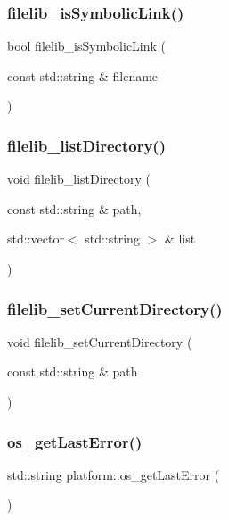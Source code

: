 \subsubsection{\texorpdfstring{filelib\+\_\+is\+Symbolic\+Link()}{filelib\_isSymbolicLink()}}
{\footnotesize\ttfamily bool filelib\+\_\+is\+Symbolic\+Link (\begin{DoxyParamCaption}\item[{const std\+::string \&}]{filename }\end{DoxyParamCaption})}

\mbox{\label{namespaceplatform_acad9142fb05b5756d75b8f8a68b5558b}} 
\subsubsection{\texorpdfstring{filelib\+\_\+list\+Directory()}{filelib\_listDirectory()}}
{\footnotesize\ttfamily void filelib\+\_\+list\+Directory (\begin{DoxyParamCaption}\item[{const std\+::string \&}]{path,  }\item[{std\+::vector$<$ std\+::string $>$ \&}]{list }\end{DoxyParamCaption})}

\mbox{\label{namespaceplatform_afe79a966d14e3b8d08939712884fa9d3}} 
\subsubsection{\texorpdfstring{filelib\+\_\+set\+Current\+Directory()}{filelib\_setCurrentDirectory()}}
{\footnotesize\ttfamily void filelib\+\_\+set\+Current\+Directory (\begin{DoxyParamCaption}\item[{const std\+::string \&}]{path }\end{DoxyParamCaption})}

\mbox{\label{namespaceplatform_a33caced893c9dd544cd80f354c5ec359}} 
\subsubsection{\texorpdfstring{os\+\_\+get\+Last\+Error()}{os\_getLastError()}}
{\footnotesize\ttfamily std\+::string platform\+::os\+\_\+get\+Last\+Error (\begin{DoxyParamCaption}{ }\end{DoxyParamCaption})}

